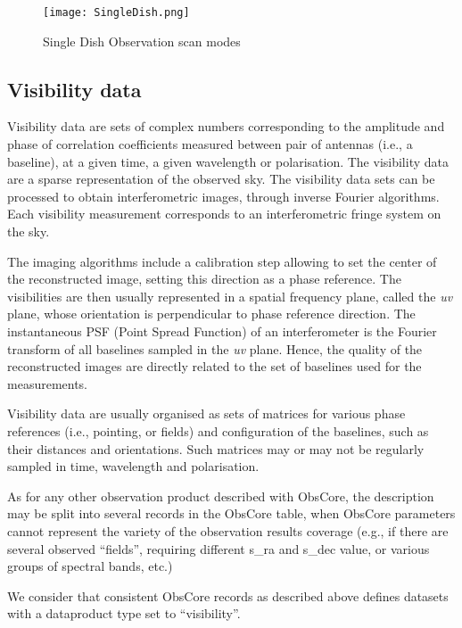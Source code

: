 \documentclass[11pt,a4paper]{ivoa}
\begin{document}
\begin{figure}[H]
\centering

\texttt{[image: SingleDish.png]}
\caption{Single Dish Observation scan modes}
\label{fig:SD}
\end{figure}



\subsection{Visibility data }
\label{sec:visibility}

Visibility data are sets of complex numbers corresponding to the amplitude and phase 
of correlation coefficients measured between pair of antennas (i.e., a baseline), at 
a given time, a given wavelength or polarisation. The visibility data are a sparse 
representation of the observed sky. The visibility data sets can be processed to obtain 
interferometric images, through inverse Fourier algorithms. Each visibility measurement 
corresponds to an interferometric fringe system on the sky. 

The imaging algorithms include a calibration step allowing to set the center of the 
reconstructed image, setting this direction as a phase reference. The visibilities
are then usually represented in a spatial frequency plane, called the \emph{uv} plane, 
whose orientation is perpendicular to phase reference direction. The instantaneous PSF 
(Point Spread Function) of an interferometer is the Fourier transform of all baselines 
sampled in the \emph{uv} plane. Hence, the quality of the reconstructed images are 
directly related to the set of baselines used for the measurements.

Visibility data are usually organised as sets of matrices for various phase references
(i.e., pointing, or fields) and configuration of the baselines, such as their
distances and orientations. Such matrices may or may not be regularly sampled in time, 
wavelength and polarisation.
    
As for any other observation product described with ObsCore, the description may be split into
several records in the ObsCore table, when ObsCore parameters cannot represent the 
variety of the observation results coverage (e.g., if there are several observed ``fields'', 
requiring different s\_ra and s\_dec value, or various groups of spectral bands, etc.) 

We consider that consistent ObsCore records as described above defines datasets with 
a dataproduct type set to ``visibility''.
\end{document}
